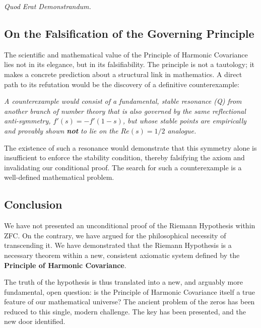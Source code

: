 \documentclass{article}
\theoremstyle{plain}
\theoremstyle{definition}
\theoremstyle{remark}
\begin{document}
\begin{center}
\textit{Quod Erat Demonstrandum.}
\end{center}

\subsection*{On the Falsification of the Governing Principle}

The scientific and mathematical value of the Principle of Harmonic Covariance lies not in its elegance, but in its falsifiability. The principle is not a tautology; it makes a concrete prediction about a structural link in mathematics. A direct path to its refutation would be the discovery of a definitive counterexample:

\textit{A counterexample would consist of a fundamental, stable resonance (Q) from another branch of number theory that is also governed by the same reflectional anti-symmetry, $f'(s) = -f'(1-s)$, but whose stable points are empirically and provably shown \textbf{not} to lie on the $Re(s)=1/2$ analogue.}

The existence of such a resonance would demonstrate that this symmetry alone is insufficient to enforce the stability condition, thereby falsifying the axiom and invalidating our conditional proof. The search for such a counterexample is a well-defined mathematical problem.

\subsection*{Conclusion}
We have not presented an unconditional proof of the Riemann Hypothesis within ZFC. On the contrary, we have argued for the philosophical necessity of transcending it. We have demonstrated that the Riemann Hypothesis is a necessary theorem within a new, consistent axiomatic system defined by the \textbf{Principle of Harmonic Covariance}.

The truth of the hypothesis is thus translated into a new, and arguably more fundamental, open question: is the Principle of Harmonic Covariance itself a true feature of our mathematical universe? The ancient problem of the zeros has been reduced to this single, modern challenge. The key has been presented, and the new door identified.
\end{document}

